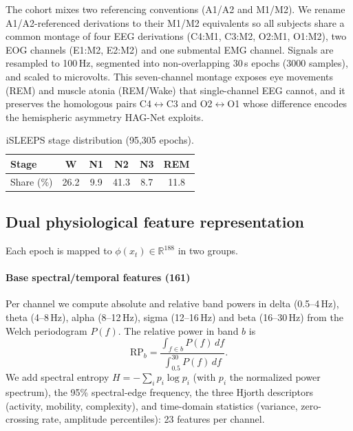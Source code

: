 \documentclass[journal]{IEEEtran}
\begin{document}
The cohort mixes two referencing conventions (A1/A2 and M1/M2). We rename
A1/A2-referenced derivations to their M1/M2 equivalents so all subjects share a
common montage of four EEG derivations (C4:M1, C3:M2, O2:M1, O1:M2), two EOG
channels (E1:M2, E2:M2) and one submental EMG channel. Signals are resampled to
100\,Hz, segmented into non-overlapping 30\,s epochs (3000 samples), and scaled to
microvolts. This seven-channel montage exposes eye movements (REM) and muscle
atonia (REM/Wake) that single-channel EEG cannot, and it preserves the
homologous pairs C4$\leftrightarrow$C3 and O2$\leftrightarrow$O1 whose difference
encodes the hemispheric asymmetry HAG-Net exploits.

\begin{table}[t]
\caption{iSLEEPS stage distribution (95{,}305 epochs).}
\label{tab:dist}
\centering
\begin{tabular}{lccccc}
\toprule
Stage & W & N1 & N2 & N3 & REM \\
\midrule
Share (\%) & 26.2 & 9.9 & 41.3 & 8.7 & 11.8 \\
\bottomrule
\end{tabular}
\end{table}

\subsection{Dual physiological feature representation}
Each epoch is mapped to $\phi(x_t)\in\mathbb{R}^{188}$ in two groups.

\paragraph{Base spectral/temporal features (161)}
Per channel we compute absolute and relative band powers in delta (0.5--4\,Hz),
theta (4--8\,Hz), alpha (8--12\,Hz), sigma (12--16\,Hz) and beta (16--30\,Hz) from
the Welch periodogram $P(f)$. The relative power in band $b$ is
\begin{equation}
\mathrm{RP}_b=\frac{\int_{f\in b}P(f)\,df}{\int_{0.5}^{30}P(f)\,df}.
\end{equation}
We add spectral entropy $H=-\sum_i p_i\log p_i$ (with $p_i$ the normalized power
spectrum), the 95\% spectral-edge frequency, the three Hjorth
descriptors~\cite{hjorth1970eeg} (activity, mobility, complexity), and time-domain
statistics (variance, zero-crossing rate, amplitude percentiles): 23 features per
channel.
\end{document}
